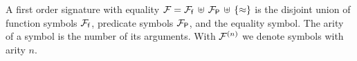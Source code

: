 
\begin{definition}\label{def:signature}
A 
first order 
{\myem signature} with equality
${\mathcal F} = {{\mathcal F}_{\mathsf f}}\,\uplus\,{{\mathcal F}_{\mathsf P}}\,\uplus\,\{\approx\}$ 
is the disjoint union of 
{\myem function symbols} ${{\mathcal F}_{\mathsf f}}$, 
{\myem predicate symbols} ${{\mathcal F}_{\mathsf P}}$,
and the equality symbol.
%
The {\myem arity} of a symbol is the number of its arguments.
With ${\mathcal F^{(n)}}$ we denote symbols with arity $n$.
\end{definition}
